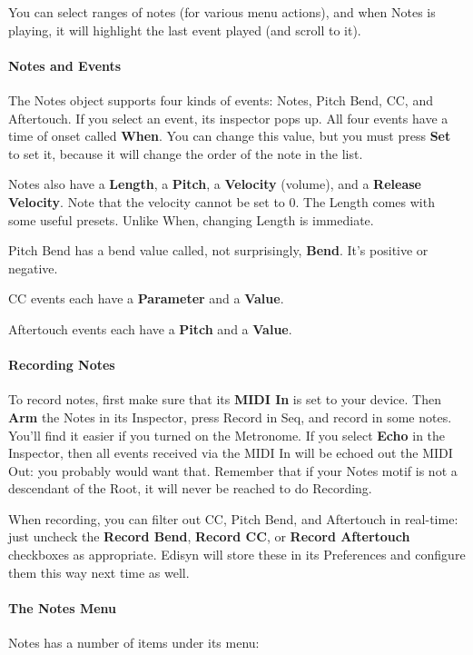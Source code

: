\documentclass[twoside,10pt]{article}
\begin{document}
You can select ranges of notes (for various menu actions), and when Notes is playing, it will highlight the last event played (and scroll to it).

\paragraph{Notes and Events} The Notes object supports four kinds of events: Notes, Pitch Bend, CC, and Aftertouch.  If you select an event, its inspector pops up.  All four events have a time of onset called {\bf When}.  You can change this value, but you must press {\bf Set} to set it, because it will change the order of the note in the list.

Notes also have a {\bf Length}, a {\bf Pitch}, a {\bf Velocity} (volume), and a {\bf Release Velocity}.  Note that the velocity cannot be set to 0.  The Length comes with some useful presets.  Unlike When, changing Length is immediate.

Pitch Bend has a bend value called, not surprisingly, {\bf Bend}. It's positive or negative.

CC events each have a {\bf Parameter} and a {\bf Value}.

Aftertouch events each have a {\bf Pitch} and a {\bf Value}.

\paragraph{Recording Notes} To record notes, first make sure that its {\bf MIDI In} is set to your device.  Then {\bf Arm} the Notes in its Inspector, press Record in Seq, and record in some notes.  You'll find it easier if you turned on the Metronome.  If you select {\bf Echo} in the Inspector, then all events received via the MIDI In will be echoed out the MIDI Out: you probably would want that.  Remember that if your Notes motif is not a descendant of the Root, it will never be reached to do Recording.

When recording, you can filter out CC, Pitch Bend, and Aftertouch in real-time: just uncheck the {\bf Record Bend}, {\bf Record CC}, or {\bf Record Aftertouch} checkboxes as appropriate.  Edisyn will store these in its Preferences and configure them this way next time as well.

\paragraph{The Notes Menu} Notes has a number of items under its menu:
\end{document}

